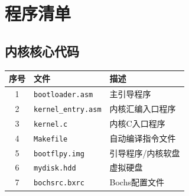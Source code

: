 \documentclass[logo,reportComp]{thesis}
\begin{document}
\appendix
\appendixconfig
\section{程序清单}
\subsection{内核核心代码}
\begin{center}
\begin{tabular}{|c|l|l|}\hline
\textbf{序号} & \textbf{文件} & \textbf{描述} \\\hline
1 & \verb'bootloader.asm' & 主引导程序\\\hline
2 & \verb'kernel_entry.asm' & 内核汇编入口程序\\\hline
3 & \verb'kernel.c' & 内核C入口程序\\\hline
4 & \verb'Makefile' & 自动编译指令文件\\\hline
5 & \verb'bootflpy.img' & 引导程序/内核软盘\\\hline
6 & \verb'mydisk.hdd' & 虚拟硬盘\\\hline
7 & \verb'bochsrc.bxrc' & Bochs配置文件\\\hline
\end{tabular}
\end{center}
\end{document}

